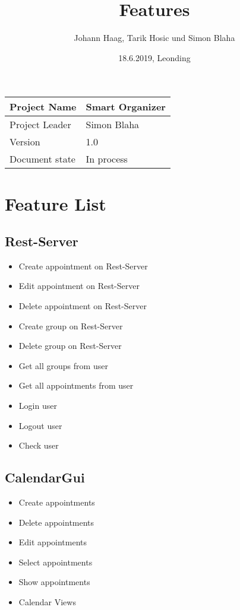 \documentclass[12pt]{scrartcl}
\title{Features}
\author{Johann Haag, Tarik Hosic und Simon Blaha}
\date{18.6.2019, Leonding}
\begin{document}
    \maketitle
    \begin{flushleft}
    \begin{tabular}{|l|l|}
    \hline
    Project Name & Smart Organizer \\ \hline
    Project Leader & Simon Blaha \\ \hline
    Version & 1.0\\ \hline
    Document state & In process \\ \hline
    \end{tabular}
    \end{flushleft}

    \pagebreak
    \tableofcontents
    \pagebreak

    \section{Feature List}
    \subsection{Rest-Server}
    \begin{itemize}
        \item Create appointment on Rest-Server
        \item Edit appointment on Rest-Server
        \item Delete appointment on Rest-Server
        \item Create group on Rest-Server
        \item Delete group on Rest-Server
        \item Get all groups from user
        \item Get all appointments from user
        \item Login user 
        \item Logout user 
        \item Check user
    \end{itemize}
    \subsection{CalendarGui}
    \begin{itemize}
        \item Create appointments
        \item Delete appointments
        \item Edit appointments
        \item Select appointments
        \item Show appointments
        \item Calendar Views
    \end{itemize}
\end{document}
